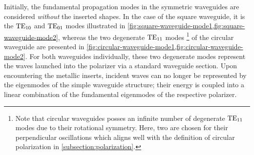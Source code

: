 \documentclass[11pt,a4paper,twoside,openany]{report}
\begin{document}
Initially, the fundamental propagation modes in the symmetric waveguides are considered \emph{without} the inserted shapes. In the case of the square waveguide, it is the $\text{TE}_{10}$ and $\text{TE}_{01}$ modes illustrated in \cref{fig:square-waveguide-mode1,fig:square-waveguide-mode2}, whereas the two degenerate $\text{TE}_{11}$ modes%
    \footnote{Note that circular waveguides posses an infinite number of degenerate $\text{TE}_{11}$ modes due to their rotational symmetry. Here, two are chosen for their perpendicular oscillations which aligns well with the definition of circular polarization in \cref{subsection:polarization}.}
of the circular waveguide are presented in \cref{fig:circular-waveguide-mode1,fig:circular-waveguide-mode2}. For both waveguides individually, these two degenerate modes represent the waves launched into the polarizer via a standard waveguide section. Upon encountering the metallic inserts, incident waves can no longer be represented by the eigenmodes of the simple waveguide structure; their energy is coupled into a linear combination of the fundamental eigenmodes of the respective polarizer.
\end{document}
